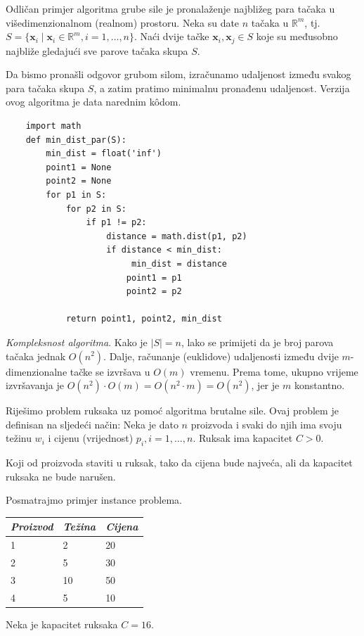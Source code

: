 \begin{example}
	Odličan primjer algoritma grube sile je pronalaženje naj\-bližeg para tačaka u višedimenzionalnom (realnom) prostoru. Neka su date $n$ tačaka u $\mathbb{R}^m$, tj. $S=\{ \textbf{x}_i \mid \textbf{x}_i \in  \mathbb{R}^m, i=1, \ldots, n\}$. Naći dvije tačke $\textbf{x}_i, \textbf{x}_j \in S$ koje su međusobno najbliže gledajući sve parove tačaka skupa $S$.
\end{example}
\begin{solution}
    Da bismo pronašli odgovor grubom silom,  izračunamo uda\-ljenost između svakog  para tačaka skupa $S$, a zatim pratimo minimalnu pronađenu udaljenost. Verzija ovog algoritma je data narednim k\^odom.
   
\footnotesize{
\begin{verbatim}
	import math 
	def min_dist_par(S):
		min_dist = float('inf')
		point1 = None	
		point2 = None
		for p1 in S:
			for p2 in S:
				if p1 != p2:
					distance = math.dist(p1, p2)
					if distance < min_dist:
					     min_dist = distance
    			 		point1 = p1
    			 		point2 = p2
    			 		
    	    return point1, point2, min_dist
\end{verbatim}}
\end{solution}

\textit{Kompleksnost algoritma}. Kako je $|S| = n$, lako se primijeti da je broj parova tačaka jednak $O(n^2)$. Dalje, računanje (euklidove) udaljenosti između dvije $m$-dimenzionalne tačke se izvršava u $O(m)$ vremenu. Prema tome, ukupno vrijeme izvršavanja je $O(n^2)\cdot O(m) = O(n^2\cdot m) = O(n^2)$, jer je $m$ konstantno.

\begin{example}
	Riješimo problem ruksaka uz pomoć algoritma brutalne sile. Ovaj problem je definisan na sljedeći način: Neka je dato $n$ proizvoda i svaki do njih ima svoju težinu $w_i$ i cijenu (vrijednost) $p_i, i=1,\ldots, n$. Ruksak ima kapacitet $C>0$.
	
	 Koji od proizvoda staviti u ruksak, tako da cijena bude najveća, ali da   kapacitet ruksaka ne bude narušen. 
\end{example}

\begin{solution}
	Posmatrajmo primjer instance problema.
\begin{center}	
	\begin{tabular}{lll}
		\emph{Proizvod} & \emph{Težina} & \emph{Cijena} \\ \hline
		1        &  2	& 20 \\
		2		& 	5	& 30 \\
		3		& 10	& 50 \\
		4		&  5 	& 10 \\ \hline
	\end{tabular}
\end{center}
Neka je kapacitet ruksaka $C=16$.


\end{solution}

